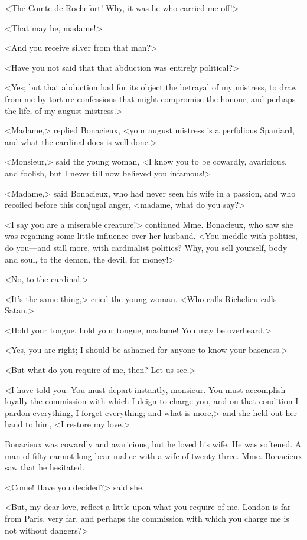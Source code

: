 <The Comte de Rochefort! Why, it was he who carried me off!> 

<That may be, madame!> 

<And you receive silver from that man?> 

<Have you not said that that abduction was entirely political?> 

<Yes; but that abduction had for its object the betrayal of my mistress, to draw from me by torture confessions that might compromise the honour, and perhaps the life, of my august mistress.> 

<Madame,> replied Bonacieux, <your august mistress is a perfidious Spaniard, and what the cardinal does is well done.> 

<Monsieur,> said the young woman, <I know you to be cowardly, avaricious, and foolish, but I never till now believed you infamous!> 

<Madame,> said Bonacieux, who had never seen his wife in a passion, and who recoiled before this conjugal anger, <madame, what do you say?> 

<I say you are a miserable creature!> continued Mme. Bonacieux, who saw she was regaining some little influence over her husband. <You meddle with politics, do you---and still more, with cardinalist politics? Why, you sell yourself, body and soul, to the demon, the devil, for money!> 

<No, to the cardinal.> 

<It's the same thing,> cried the young woman. <Who calls Richelieu calls Satan.> 

<Hold your tongue, hold your tongue, madame! You may be overheard.> 

<Yes, you are right; I should be ashamed for anyone to know your baseness.> 

<But what do you require of me, then? Let us see.> 

<I have told you. You must depart instantly, monsieur. You must accomplish loyally the commission with which I deign to charge you, and on that condition I pardon everything, I forget everything; and what is more,> and she held out her hand to him, <I restore my love.> 

Bonacieux was cowardly and avaricious, but he loved his wife. He was softened. A man of fifty cannot long bear malice with a wife of twenty-three. Mme. Bonacieux saw that he hesitated. 

<Come! Have you decided?> said she. 

<But, my dear love, reflect a little upon what you require of me. London is far from Paris, very far, and perhaps the commission with which you charge me is not without dangers?> 

